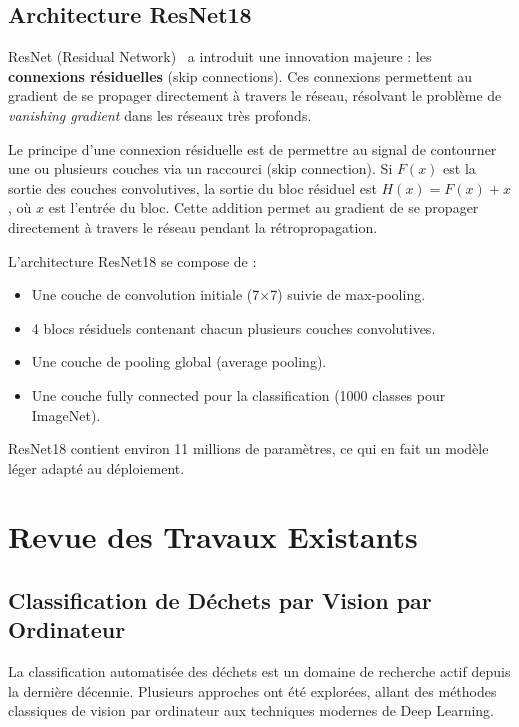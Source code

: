 \documentclass[12pt,a4paper]{report}
\begin{document}
\section{Architecture ResNet18}
ResNet (Residual Network)~\cite{he2016deep} a introduit une innovation majeure : les \textbf{connexions résiduelles} (skip connections). Ces connexions permettent au gradient de se propager directement à travers le réseau, résolvant le problème de \textit{vanishing gradient} dans les réseaux très profonds.

Le principe d'une connexion résiduelle est de permettre au signal de contourner une ou plusieurs couches via un raccourci (skip connection). Si $F(x)$ est la sortie des couches convolutives, la sortie du bloc résiduel est $H(x) = F(x) + x$, où $x$ est l'entrée du bloc. Cette addition permet au gradient de se propager directement à travers le réseau pendant la rétropropagation.

L'architecture ResNet18 se compose de :
\begin{itemize}
    \item Une couche de convolution initiale (7$\times$7) suivie de max-pooling.
    \item 4 blocs résiduels contenant chacun plusieurs couches convolutives.
    \item Une couche de pooling global (average pooling).
    \item Une couche fully connected pour la classification (1000 classes pour ImageNet).
\end{itemize}
ResNet18 contient environ 11 millions de paramètres, ce qui en fait un modèle léger adapté au déploiement.

\chapter{Revue des Travaux Existants}

\section{Classification de Déchets par Vision par Ordinateur}
La classification automatisée des déchets est un domaine de recherche actif depuis la dernière décennie. Plusieurs approches ont été explorées, allant des méthodes classiques de vision par ordinateur aux techniques modernes de Deep Learning.
\end{document}
